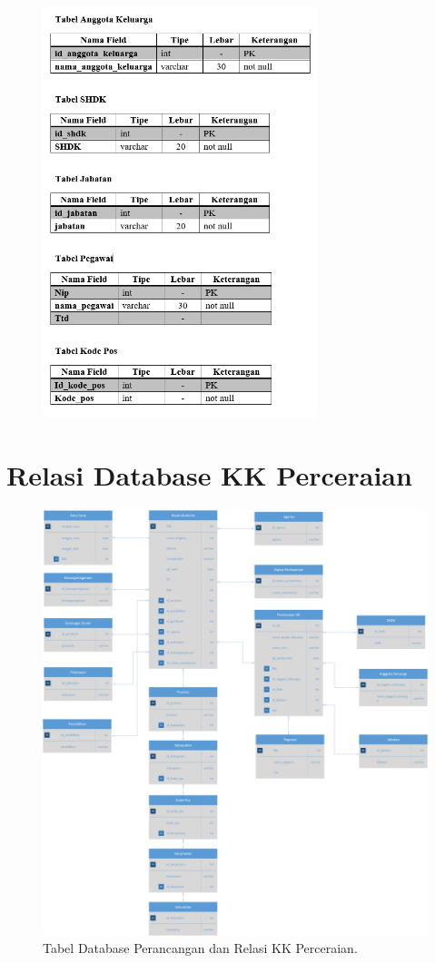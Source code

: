 \begin{figure}[H]
	\centering
	\includegraphics[width=8cm]{figures/tabel5.png}
\end{figure}
\section{Relasi Database KK Perceraian}
\begin{figure}[H]
	\centering
	\includegraphics[width=14cm]{figures/relasi.png}
	\caption{Tabel Database Perancangan dan Relasi KK Perceraian.}
\end{figure}
